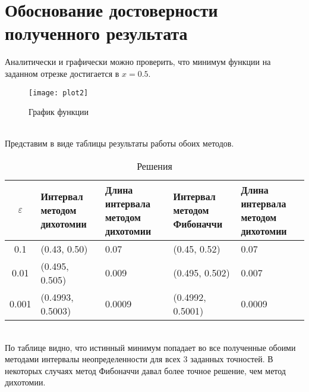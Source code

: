 \section{Обоснование достоверности полученного результата}
Аналитически и графически можно проверить, что минимум функции на заданном отрезке достигается в $x=0.5$.\\
\begin{figure}[!htb]
    \centering
    \texttt{[image: plot2]}
    \caption{График функции}
    \label{fig:proof}
\end{figure}\\
Представим в виде таблицы результаты работы обоих методов.\\
\begin{table}[h]
	\centering
		\begin{tabular} {|c|m{3 cm}|m{3 cm}|m{3 cm}|m{3 cm}|}
			\hline
			$\varepsilon$ & Интервал методом дихотомии & Длина интервала методом дихотомии & Интервал методом Фибоначчи & Длина интервала методом дихотомии \\ \hline
			0.1 & (0.43, 0.50) & 0.07 & (0.45, 0.52)& 0.07\\ \hline
			0.01 & (0.495, 0.505) & 0.009 & (0.495, 0.502) & 0.007\\ \hline
			0.001 & (0.4993, 0.5003) & 0.0009 & (0.4992, 0.5001) &  0.0009\\ \hline
		\end{tabular}
		\caption{Решения}
	\end{table}\\
По таблице видно, что истинный минимум попадает во все полученные обоими методами интервалы неопределенности для всех 3 заданных точностей. В некоторых случаях метод Фибоначчи давал более точное решение, чем метод дихотомии.



